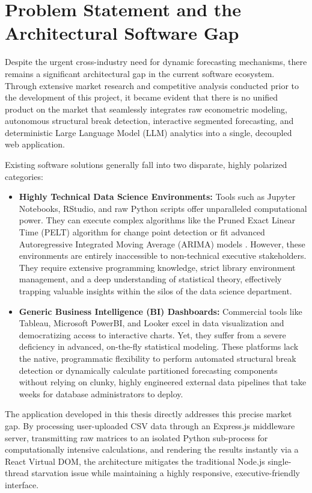 \documentclass[11pt, a4paper]{report}
\begin{document}
\section{Problem Statement and the Architectural Software Gap}
Despite the urgent cross-industry need for dynamic forecasting mechanisms, there remains a significant architectural gap in the current software ecosystem. Through extensive market research and competitive analysis conducted prior to the development of this project, it became evident that there is no unified product on the market that seamlessly integrates raw econometric modeling, autonomous structural break detection, interactive segmented forecasting, and deterministic Large Language Model (LLM) analytics into a single, decoupled web application.

Existing software solutions generally fall into two disparate, highly polarized categories:
\begin{itemize}
    \item \textbf{Highly Technical Data Science Environments:} Tools such as Jupyter Notebooks, RStudio, and raw Python scripts offer unparalleled computational power. They can execute complex algorithms like the Pruned Exact Linear Time (PELT) algorithm for change point detection \cite{Killick2012} or fit advanced Autoregressive Integrated Moving Average (ARIMA) models \cite{BoxJenkins1970}. However, these environments are entirely inaccessible to non-technical executive stakeholders. They require extensive programming knowledge, strict library environment management, and a deep understanding of statistical theory, effectively trapping valuable insights within the silos of the data science department.
    \item \textbf{Generic Business Intelligence (BI) Dashboards:} Commercial tools like Tableau, Microsoft PowerBI, and Looker excel in data visualization and democratizing access to interactive charts. Yet, they suffer from a severe deficiency in advanced, on-the-fly statistical modeling. These platforms lack the native, programmatic flexibility to perform automated structural break detection or dynamically calculate partitioned forecasting components without relying on clunky, highly engineered external data pipelines that take weeks for database administrators to deploy.
\end{itemize}

The application developed in this thesis directly addresses this precise market gap. By processing user-uploaded CSV data through an Express.js middleware server, transmitting raw matrices to an isolated Python sub-process for computationally intensive calculations, and rendering the results instantly via a React Virtual DOM, the architecture mitigates the traditional Node.js single-thread starvation issue while maintaining a highly responsive, executive-friendly interface.
\end{document}
